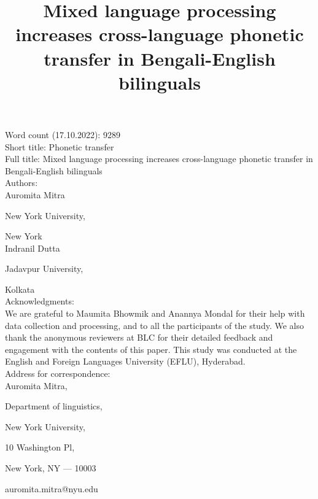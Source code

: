\documentclass[12 pt]{article}
\title{Mixed language processing increases cross-language phonetic transfer in Bengali-English bilinguals}
\newlength\mystoreparindent
\newenvironment{myparindent}[1]{%
	\setlength{\mystoreparindent}{\the\parindent}
	\setlength{\parindent}{#1}
}{%
	\setlength{\parindent}{\mystoreparindent}
}
\begin{document}




\begin{singlespace}

\begin{myparindent}{0pt}
	
Word count (17.10.2022): 9289 \\
	
	
Short title: Phonetic transfer\\

Full title: Mixed language processing increases cross-language phonetic transfer in Bengali-English bilinguals\\

Authors:\\

Auromita Mitra

New York University,

New York\\

Indranil Dutta

Jadavpur University,

Kolkata\\

Acknowledgments:\\
We are grateful to Maumita Bhowmik and Anannya Mondal for their help with data collection and processing, and to all the participants of the study. We also thank the anonymous reviewers at BLC for their detailed feedback and engagement with the contents of this paper. This study was conducted at the English and Foreign Languages University (EFLU), Hyderabad. \\
 

Address for correspondence:\\
Auromita Mitra,

Department of linguistics,

New York University,

10 Washington Pl,

New York, NY --- 10003

auromita.mitra@nyu.edu

\end{myparindent}

\end{singlespace}
\end{document}
